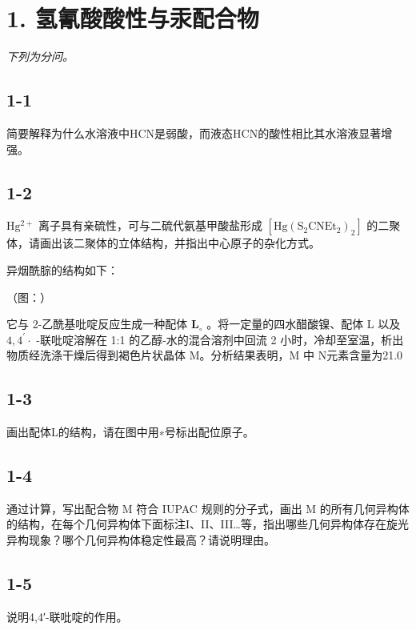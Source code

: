 \section*{1. 氢氰酸酸性与汞配合物}
\textit{下列为分问。}

\subsection*{1-1}
简要解释为什么⽔溶液中HCN是弱酸，⽽液态HCN的酸性相⽐其⽔溶液显著增强。

\subsection*{1-2}
$\mathrm { H g ^ { 2 + } }$ 离⼦具有亲硫性，可与⼆硫代氨基甲酸盐形成 $\mathrm { [ H g ( S _ { 2 } C N E t _ { 2 } ) _ { 2 } ] }$ 的⼆聚体，请画出该⼆聚体的⽴体结构，并指出中⼼原⼦的杂化⽅式。

异烟酰腙的结构如下：

（图：）

它与 2-⼄酰基吡啶反应⽣成⼀种配体 $\mathbf { L } _ { \circ }$ 。将⼀定量的四⽔醋酸镍、配体 L 以及 $4 , 4 ^ { \prime } \cdot$ -联吡啶溶解在 1:1 的⼄醇-⽔的混合溶剂中回流 2 ⼩时，冷却⾄室温，析出物质经洗涤⼲燥后得到褐⾊⽚状晶体 M。分析结果表明，M 中 N元素含量为21.0%

\subsection*{1-3}
画出配体L的结构，请在图中⽤∗号标出配位原⼦。

\subsection*{1-4}
通过计算，写出配合物 M 符合 IUPAC 规则的分⼦式，画出 M 的所有⼏何异构体的结构，在每个⼏何异构体下⾯标注I、II、III…等，指出哪些⼏何异构体存在旋光异构现象？哪个⼏何异构体稳定性最⾼？请说明理由。

\subsection*{1-5}
说明4,4′-联吡啶的作⽤。
